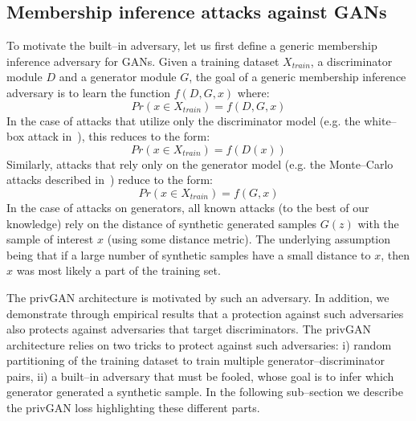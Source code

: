 \documentclass{article}
\begin{document}
\subsection{Membership inference attacks against GANs}
To motivate the built--in adversary, let us first define a generic membership inference adversary for GANs. Given a training dataset $X_{train}$, a discriminator module $D$ and a generator module $G$, the goal of a generic membership inference adversary is to learn the function $f(D,G,x)$ where: 
\begin{equation}
    Pr(x \in X_{train}) = f(D,G,x)
\end{equation}
In the case of attacks that utilize only the discriminator model (e.g. the white--box attack in~\cite{hayes2019logan}), this reduces to the form: 
\begin{equation}
    Pr(x \in X_{train}) = f(D(x))
\end{equation}
Similarly, attacks that rely only on the generator model (e.g. the Monte--Carlo attacks described in~\cite{hilprecht2019monte}) reduce to the form: 
\begin{equation}
    Pr(x \in X_{train}) = f(G,x)
\end{equation}
In the case of attacks on generators, all known attacks (to the best of our knowledge) rely on the distance of synthetic generated samples $G(z)$ with the sample of interest $x$ (using some distance metric). The underlying assumption being that if a large number of synthetic samples have a small distance to $x$, then $x$ was most likely a part of the training set.

The privGAN architecture is motivated by such an adversary.  In addition, we demonstrate through empirical results that a protection against such adversaries also protects against adversaries that target discriminators. The privGAN architecture relies on two tricks to protect against such adversaries: i) random partitioning of the training dataset to train multiple generator--discriminator pairs, ii) a built--in adversary that must be fooled, whose goal is to infer which generator generated a synthetic sample. In the following sub--section we describe the privGAN loss highlighting these different parts. 
\end{document}
